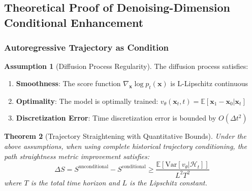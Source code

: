 \documentclass{article}
\theoremstyle{plain}
\newtheorem{theorem}{Theorem}[section]
\theoremstyle{definition}
\newtheorem{assumption}[theorem]{Assumption}
\theoremstyle{remark}
\newcommand{\vx}{\mathbf{x}}
\begin{document}
\subsection{Theoretical Proof of Denoising-Dimension Conditional Enhancement}

\subsubsection{Autoregressive Trajectory as Condition}

\begin{assumption}[Diffusion Process Regularity]
The diffusion process satisfies:
\begin{enumerate}
    \item \textbf{Smoothness}: The score function $\nabla_{\vx} \log p_t(\vx)$ is L-Lipschitz continuous
    \item \textbf{Optimality}: The model is optimally trained: $v_\theta(\vx_t,t) = \mathbb{E}[\vx_1 - \vx_0 | \vx_t]$
    \item \textbf{Discretization Error}: Time discretization error is bounded by $O(\Delta t^2)$
\end{enumerate}
\end{assumption}

\begin{theorem}[Trajectory Straightening with Quantitative Bounds]
\label{thm:quantitative_straightening}
Under the above assumptions, when using complete historical trajectory conditioning, the path straightness metric improvement satisfies:
\begin{equation}
\Delta S = S^{\text{unconditional}} - S^{\text{conditional}} \geq \frac{\mathbb{E}[\text{Var}[v_\theta|\mathcal{H}_t]]}{L^2 T^2}
\end{equation}
where $T$ is the total time horizon and $L$ is the Lipschitz constant.
\end{theorem}
\end{document}
